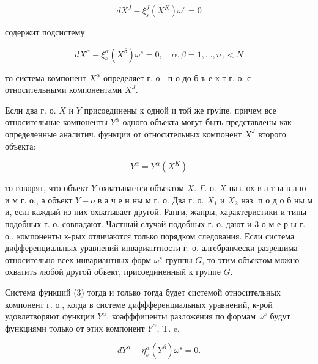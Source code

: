 \documentclass[10pt]{article}
\begin{document}
\[

d X^{J}-\xi_{s}^{J}\left(X^{K}\right) \omega^{s}=0

\]



содержит подсистему



\[

d X^{\alpha}-\xi_{s}^{\alpha}\left(X^{\beta}\right) \omega^{s}=0, \quad \alpha, \beta=1, \ldots, n_{1}<N

\]



то система компонент $X^{\alpha}$ определяет г. о.- п о до б ъ е к т г. о. с относительными компонентами $X^{J}$.



Если два г. о. $X$ и $Y$ присоединены к одной и той же груіпе, причем все относительные компоненты $Y^{\alpha}$ одного объекта могут быть представлены как определенные аналитич. функции от относительных компонент $X^{J}$ второго объекта:



\[

Y^{\alpha}=Y^{\alpha}\left(X^{K}\right)

\]



то говорят, что объект $Y$ охватывается объектом $X$. $\Gamma$. о. $X$ наз. ох в а т ы в а ю и м г. о., а объект $Y-o$ в а ч е н ны м $г$. о. Два г. о. $X_{1}$ и $X_{2}$ наз. п о д о б ны м и, еслі каждый из них охватывает другой. Ранги, жанры, характеристики и типы подобных г. о. совпадают. Частный случай подобных г. о. дают и 3 о м е р ы-г. о., компоненты к-рых отличаются только порядком следования. Если система дифференциальных уравнений инвариантности г. о. алгебрапчески разрешима относительно всех инвариантных форм $\omega^{s}$ группы $G$, то этим объектом можно охватить любой другой объект, присоединенный к группе $G$.



Система функций (3) тогда и только тогда будет системой относительных компонент г. о., когда в системе диффференциальных уравнений, к-рой удовлетворяют функции $Y^{\alpha}$, коәфффиценты разложения по формам $\omega^{s}$ будут функциями только от этих компонент $Y^{\alpha}$, T. e.



\[

d Y^{\alpha}-\eta_{s}^{\alpha}\left(Y^{\beta}\right) \omega^{s}=0 .

\]
\end{document}
